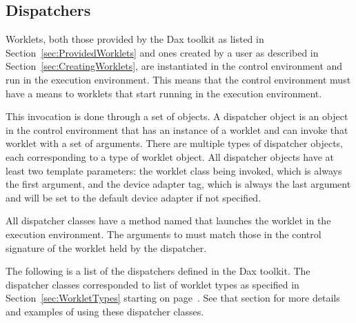 
\subsection{Dispatchers}
\label{sec:Dispatchers}

Worklets, both those provided by the Dax toolkit as listed in
Section~\ref{sec:ProvidedWorklets} and ones created by a user as described
in Section~\ref{sec:CreatingWorklets}, are instantiated in the control
environment and run in the execution environment. This means that the
control environment must have a means to 
worklets that start running in the execution environment.

This invocation is done through a set of
 objects. A dispatcher object is an
object in the control environment that has an instance of a worklet and can
invoke that worklet with a set of arguments. There are multiple types of
dispatcher objects, each corresponding to a type of worklet object. All
dispatcher objects have at least two template parameters: the worklet class
being invoked, which is always the first argument, and the device adapter
tag, which is always the last argument and will be set to the default
device adapter if not specified.

All dispatcher classes have a method named  that launches
the worklet in the execution environment.  The arguments to
 must match those in the control signature of the worklet
held by the dispatcher.

The following is a list of the dispatchers defined in the Dax toolkit. The
dispatcher classes corresponded to list of worklet types as specified in
Section~\ref{sec:WorkletTypes} starting on
page~\pageref{sec:WorkletTypes}. See that section for more details and
examples of using these dispatcher classes.

